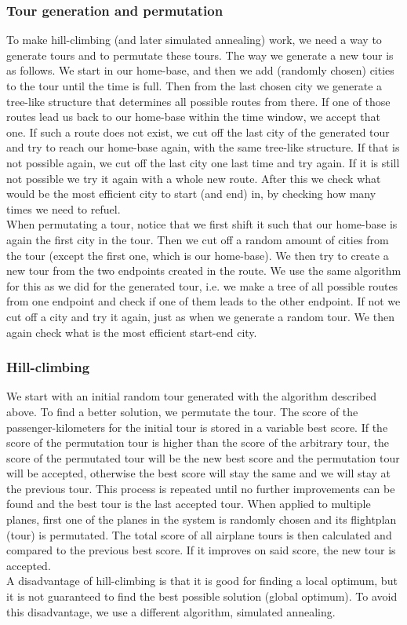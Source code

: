 \documentclass[journal]{IEEEtran}
\begin{document}
\subsubsection{Tour generation and permutation}
To make hill-climbing (and later simulated annealing) work, we need a way to generate tours and to permutate these tours. The way we generate a new tour is as follows. We start in our home-base, and then we add (randomly chosen) cities to the tour until the time is full. Then from the last chosen city we generate a tree-like structure that determines all possible routes from there. If one of those routes lead us back to our home-base within the time window, we accept that one. If such a route does not exist, we cut off the last city of the generated tour and try to reach our home-base again, with the same tree-like structure. If that is not possible again, we cut off the last city one last time and try again. If it is still not possible we try it again with a whole new route. After this we check what would be the most efficient city to start (and end) in, by checking how many times we need to refuel. \\
When permutating a tour, notice that we first shift it such that our home-base is again the first city in the tour. Then we cut off a random amount of cities from the tour (except the first one, which is our home-base). We then try to create a new tour from the two endpoints created in the route. We use the same algorithm for this as we did for the generated tour, i.e. we make a tree of all possible routes from one endpoint and check if one of them leads to the other endpoint. If not we cut off a city and try it again, just as when we generate a random tour. We then again check what is the most efficient start-end city.

\subsubsection{Hill-climbing}
We start with an initial random tour generated with the algorithm described above. To find a better solution, we permutate the tour. The score of the passenger-kilometers for the initial tour is stored in a variable best score. If the score of the permutation tour is higher than the score of the arbitrary tour, the score of the permutated tour will be the new best score and the permutation tour will be accepted, otherwise the best score will stay the same and we will stay at the previous tour. This process is repeated until no further improvements can be found and the best tour is the last accepted tour. When applied to multiple planes, first one of the planes in the system is randomly chosen and its flightplan (tour) is permutated. The total score of all airplane tours is then calculated and compared to the previous best score. If it improves on said score, the new tour is accepted.\\
A disadvantage of hill-climbing is that it is good for finding a local optimum, but it is not guaranteed to find the best possible solution (global optimum). To avoid this disadvantage, we use a different algorithm, simulated annealing. \\
\end{document}
